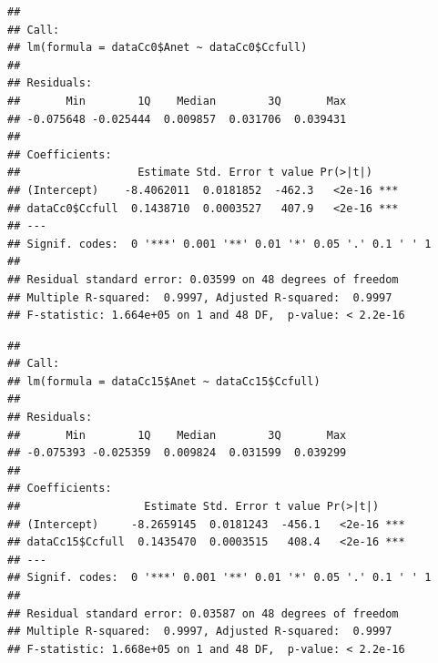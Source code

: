 \documentclass[
]{krantz}
\makeatletter
\newenvironment{Shaded}{\begin{snugshade}}{\end{snugshade}}
\newcommand{\CommentTok}[1]{\textcolor[rgb]{0.56,0.35,0.01}{\textit{#1}}}
\newcommand{\DecValTok}[1]{\textcolor[rgb]{0.00,0.00,0.81}{#1}}
\newcommand{\FunctionTok}[1]{\textcolor[rgb]{0.00,0.00,0.00}{#1}}
\newcommand{\NormalTok}[1]{#1}
\newcommand{\OtherTok}[1]{\textcolor[rgb]{0.56,0.35,0.01}{#1}}
\newcommand{\SpecialCharTok}[1]{\textcolor[rgb]{0.00,0.00,0.00}{#1}}
\newenvironment{kframe}{%
\medskip{}
\setlength{\fboxsep}{.8em}
 \def\at@end@of@kframe{}%
 \ifinner\ifhmode%
  \def\at@end@of@kframe{\end{minipage}}%
  \begin{minipage}{\columnwidth}%
 \fi\fi%
 \def\FrameCommand##1{\hskip\@totalleftmargin \hskip-\fboxsep
 \colorbox{shadecolor}{##1}\hskip-\fboxsep
     \hskip-\linewidth \hskip-\@totalleftmargin \hskip\columnwidth}%
 \MakeFramed {\advance\hsize-\width
   \@totalleftmargin\z@ \linewidth\hsize
   \@setminipage}}%
 {\par\unskip\endMakeFramed%
 \at@end@of@kframe}
\renewenvironment{Shaded}{\begin{kframe}}{\end{kframe}}
\makeatother
\begin{document}
\begin{verbatim}
## 
## Call:
## lm(formula = dataCc0$Anet ~ dataCc0$Ccfull)
## 
## Residuals:
##       Min        1Q    Median        3Q       Max 
## -0.075648 -0.025444  0.009857  0.031706  0.039431 
## 
## Coefficients:
##                  Estimate Std. Error t value Pr(>|t|)    
## (Intercept)    -8.4062011  0.0181852  -462.3   <2e-16 ***
## dataCc0$Ccfull  0.1438710  0.0003527   407.9   <2e-16 ***
## ---
## Signif. codes:  0 '***' 0.001 '**' 0.01 '*' 0.05 '.' 0.1 ' ' 1
## 
## Residual standard error: 0.03599 on 48 degrees of freedom
## Multiple R-squared:  0.9997, Adjusted R-squared:  0.9997 
## F-statistic: 1.664e+05 on 1 and 48 DF,  p-value: < 2.2e-16
\end{verbatim}

\begin{Shaded}
\end{Shaded}

\begin{verbatim}
## 
## Call:
## lm(formula = dataCc15$Anet ~ dataCc15$Ccfull)
## 
## Residuals:
##       Min        1Q    Median        3Q       Max 
## -0.075393 -0.025359  0.009824  0.031599  0.039299 
## 
## Coefficients:
##                   Estimate Std. Error t value Pr(>|t|)    
## (Intercept)     -8.2659145  0.0181243  -456.1   <2e-16 ***
## dataCc15$Ccfull  0.1435470  0.0003515   408.4   <2e-16 ***
## ---
## Signif. codes:  0 '***' 0.001 '**' 0.01 '*' 0.05 '.' 0.1 ' ' 1
## 
## Residual standard error: 0.03587 on 48 degrees of freedom
## Multiple R-squared:  0.9997, Adjusted R-squared:  0.9997 
## F-statistic: 1.668e+05 on 1 and 48 DF,  p-value: < 2.2e-16
\end{verbatim}

\begin{Shaded}
\end{Shaded}
\end{document}

